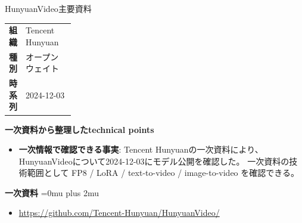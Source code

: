 \begin{technicalnote}{HunyuanVideo}{主要資料}
\begingroup
\begin{tabularx}{\linewidth}{@{}>{\bfseries}p{0.22\linewidth}X@{}}
組織 & Tencent Hunyuan \\
種別 & オープンウェイト \\
時系列 & 2024-12-03 \\
\end{tabularx}
\smallskip
{\bfseries 一次資料から整理したtechnical points}
\begin{itemize}[leftmargin=1.5em,itemsep=0.35em]
\item \textbf{一次情報で確認できる事実}: Tencent Hunyuanの一次資料により、HunyuanVideoについて2024-12-03にモデル公開を確認した。 一次資料の技術範囲として FP8 / LoRA / text-to-video / image-to-video を確認できる。
\end{itemize}
\begin{minipage}{\linewidth}
\begin{samepage}
{\bfseries 一次資料}
\begingroup\sloppy
\Urlmuskip=0mu plus 2mu\relax
\begin{itemize}[leftmargin=1.5em,itemsep=0.25em]
\item {\scriptsize\url{https://github.com/Tencent-Hunyuan/HunyuanVideo/}}
\end{itemize}
\endgroup
\end{samepage}
\end{minipage}
\endgroup
\end{technicalnote}
\medskip

